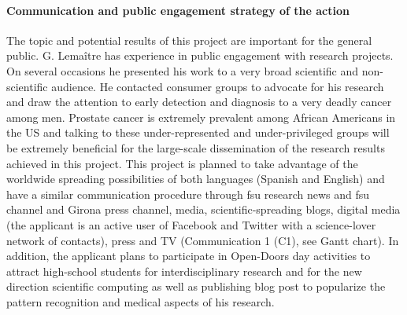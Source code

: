 \paragraph{Communication and public engagement strategy of the action}
The topic and potential results of this project are important for the general public.
G. Lema\^itre has experience in public engagement with research projects.
On several occasions he presented his work to a very broad scientific and non-scientific audience.
He contacted consumer groups to advocate for his research and draw the attention to early detection and diagnosis to a very deadly cancer among men.
Prostate cancer is extremely prevalent among African Americans in the US and talking to these under-represented and under-privileged groups will be extremely beneficial for the large-scale dissemination of the research results achieved in this project.
This project is planned to take advantage of the worldwide spreading possibilities of both languages (Spanish and English) and have a similar communication procedure through \ac{fsu} research news and \ac{fsu} channel and Girona press channel, media, scientific-spreading blogs, digital media (the applicant is an active user of Facebook and Twitter with a science-lover network of contacts), press and TV (Communication 1 (C1), see Gantt chart).
In addition, the applicant plans to participate in Open-Doors day activities to attract high-school students for interdisciplinary research and for the new direction scientific computing as well as publishing blog post to popularize the pattern recognition and medical aspects of his research.

